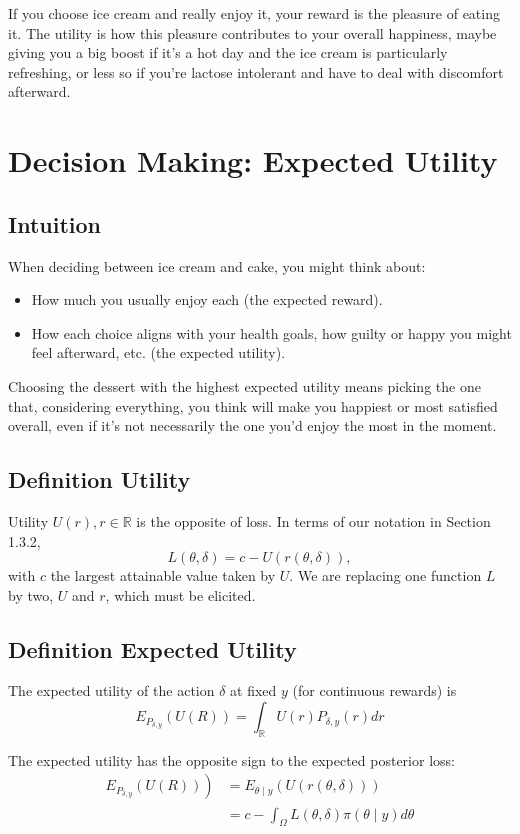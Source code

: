 \documentclass{article}
\begin{document}
If you choose ice cream and really enjoy it, your reward is the pleasure of eating it. The utility is how this pleasure contributes to your overall happiness, maybe giving you a big boost if it's a hot day and the ice cream is particularly refreshing, or less so if you're lactose intolerant and have to deal with discomfort afterward.

\section{Decision Making: Expected Utility}
\subsection{Intuition}
When deciding between ice cream and cake, you might think about:
\begin{itemize}
    \item How much you usually enjoy each (the expected reward).
    \item How each choice aligns with your health goals, how guilty or happy you might feel afterward, etc. (the expected utility).
\end{itemize}

Choosing the dessert with the highest expected utility means picking the one that, considering everything, you think will make you happiest or most satisfied overall, even if it's not necessarily the one you'd enjoy the most in the moment.
\subsection{Definition Utility}
Utility $U(r), r \in \mathbb{R}$ is the opposite of loss. In terms of our notation in Section 1.3.2,
$$
L(\theta, \delta)=c-U(r(\theta, \delta)),
$$
with $c$ the largest attainable value taken by $U$. We are replacing one function $L$ by two, $U$ and $r$, which must be elicited.
\subsection{Definition Expected Utility}
The expected utility of the action $\delta$ at fixed $y$ (for continuous rewards) is
$$
E_{P_{\delta, y}}(U(R))=\int_{\mathbb{R}} U(r) P_{\delta, y}(r) d r
$$

The expected utility has the opposite sign to the expected posterior loss:
$$
\begin{aligned}
\left.E_{P_{\delta, y}}(U(R))\right) & =E_{\theta \mid y}(U(r(\theta, \delta))) \\
& =c-\int_{\Omega} L(\theta, \delta) \pi(\theta \mid y) d \theta
\end{aligned}
$$
\end{document}
